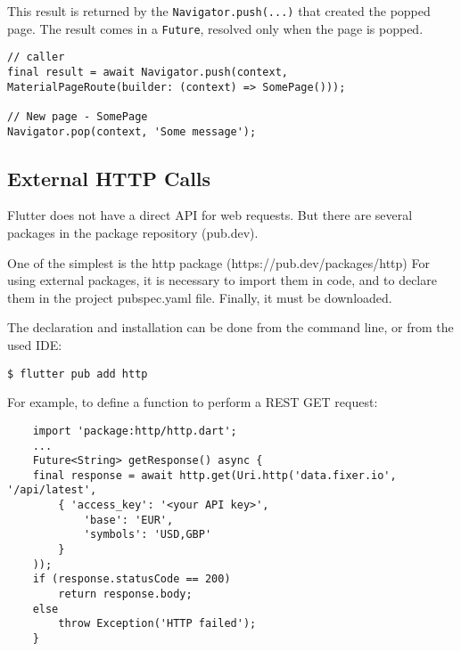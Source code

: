 This result is returned by the \texttt{Navigator.push(...)} that created the popped page.
The result comes in a \texttt{Future}, resolved only when the page is popped.

\begin{lstlisting}[title=Example]
// caller 
final result = await Navigator.push(context, MaterialPageRoute(builder: (context) => SomePage())); 

// New page - SomePage
Navigator.pop(context, 'Some message');
\end{lstlisting}


\subsection{External HTTP Calls}
Flutter does not have a direct API for web requests.
But there are several packages in the package repository (pub.dev).

One of the simplest is the http package (https://pub.dev/packages/http)
For using external packages, it is necessary to import them in code, and to
declare them in the project pubspec.yaml file. Finally, it must be downloaded.

\begin{tcolorbox}
The declaration and installation can be done from the command line, or from the
used IDE:

\texttt{\$ flutter pub add http}
\end{tcolorbox}

For example, to define a function to perform a REST GET request:

\begin{lstlisting}
    import 'package:http/http.dart';
    ...
    Future<String> getResponse() async {
    final response = await http.get(Uri.http('data.fixer.io', '/api/latest',
        { 'access_key': '<your API key>',
            'base': 'EUR',
            'symbols': 'USD,GBP' 
        }
    ));
    if (response.statusCode == 200)
        return response.body;
    else
        throw Exception('HTTP failed');
    }
\end{lstlisting}
